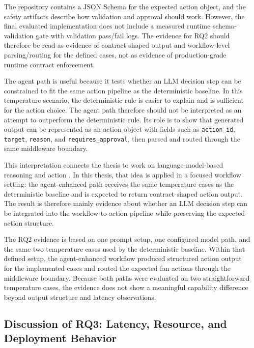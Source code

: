 The repository contains a JSON Schema for the expected action object, and the safety artifacts describe how validation and approval should work. However, the final evaluated implementation does not include a measured runtime schema-validation gate with validation pass/fail logs. The evidence for RQ2 should therefore be read as evidence of contract-shaped output and workflow-level parsing/routing for the defined cases, not as evidence of production-grade runtime contract enforcement.

The agent path is useful because it tests whether an LLM decision step can be constrained to fit the same action pipeline as the deterministic baseline. In this temperature scenario, the deterministic rule is easier to explain and is sufficient for the action choice. The agent path therefore should not be interpreted as an attempt to outperform the deterministic rule. Its role is to show that generated output can be represented as an action object with fields such as \texttt{action\_id}, \texttt{target}, \texttt{reason}, and \texttt{requires\_approval}, then parsed and routed through the same middleware boundary.


This interpretation connects the thesis to work on language-model-based reasoning and action \cite{reactYao2023}. In this thesis, that idea is applied in a focused workflow setting: the agent-enhanced path receives the same temperature cases as the deterministic baseline and is expected to return contract-shaped action output. The result is therefore mainly evidence about whether an LLM decision step can be integrated into the workflow-to-action pipeline while preserving the expected action structure.


The RQ2 evidence is based on one prompt setup, one configured model path, and the same two temperature cases used by the deterministic baseline. Within that defined setup, the agent-enhanced workflow produced structured action output for the implemented cases and routed the expected fan actions through the middleware boundary. Because both paths were evaluated on two straightforward temperature cases, the evidence does not show a meaningful capability difference beyond output structure and latency observations.

\subsection{Discussion of RQ3: Latency, Resource, and Deployment Behavior}\label{subsec:discussion-rq3-latency-resource-deployment}

